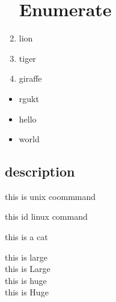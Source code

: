 \documentclass{article}
\begin{document}
	\begin{enumerate}
		\section{Enumerate}
		
		\item lion
		
		\item tiger
		\item giraffe
	\end{enumerate}
	\begin{itemize}
		\section{itemize}
		\item rgukt
		\item hello
		\item world
	\end{itemize}
	\begin{description}
		\section{description}
		\item[unix] this is unix coommmand
		\item[linux] this id linux command
		\item[cat] this is a cat
	\end{description}
	\large this is large \\
	\LARGE this is Large\\
	\huge this is huge\\
	\Huge this is Huge\\
\end{document}
